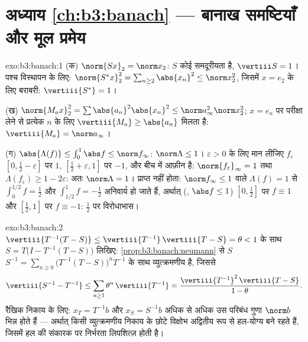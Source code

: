 \section*{अध्याय \ref{ch:b3:banach} --- बानाख समष्टियाँ और
मूल प्रमेय}

\begin{solution}{exo:b3:banach:1}
(क) $\norm{Sx}_2 = \norm x_2$: $S$ कोई समदूरीयता है, $\vertiii S =
1$। पश्च विस्थापन के लिए: $\norm{S^*x}_2^2 = \sum_{n \geq
2}\abs{x_n}^2 \leq \norm x_2^2$,
जिसमें $x = e_2$ के लिए बराबरी: $\vertiii{S^*} = 1$।

(ख) $\norm{M_ax}_2^2 = \sum\abs{a_n}^2\abs{x_n}^2 \leq \norm
a_\infty^2\norm x_2^2$; $x = e_n$ पर परीक्षा लेने से प्रत्येक $n$ के लिए $\vertiii{M_a}
\geq \abs{a_n}$ मिलता
है: $\vertiii{M_a} = \norm a_\infty$।

(ग) $\abs{\Lambda(f)} \leq \int_0^1\abs f \leq \norm f_\infty$: $\norm\Lambda \leq 1$। $\varepsilon > 0$ के लिए मान लीजिए $f_\varepsilon$ $[0, \frac12 - \varepsilon]$ पर $1$, $[\frac12 +
\varepsilon, 1]$ पर
$-1$, और बीच में आफ़ीन है: $\norm{f_\varepsilon}_\infty =
1$ तथा $\Lambda(f_\varepsilon) \geq 1 - 2\varepsilon$: अतः $\norm\Lambda = 1$। प्राप्त नहीं
होता: $\norm
f_\infty \leq 1$ वाले $\Lambda(f) = 1$ से $\int_0^{1/2}f = \frac12$ और $\int_{1/2}^1 f = -\frac12$ अनिवार्य हो जाते हैं, अर्थात्
(, $\abs f \leq 1$) $[0, \frac12]$ पर $f \equiv 1$ और $[\frac12,
1]$ पर $f \equiv -1$: $\frac12$ पर विरोधाभास।
\end{solution}

\begin{solution}{exo:b3:banach:2}
$\vertiii{T^{-1}(T-S)} \leq \vertiii{T^{-1}}\,\vertiii{T - S} =
\theta < 1$ के साथ $S = T\bigl(I - T^{-1}(T - S)\bigr)$ लिखिए: \cref{prop:b3:banach:neumann} से $S$ $S^{-1} = \sum_{n\geq0}\bigl(T^{-1}(T -
S)\bigr)^nT^{-1}$ के साथ व्युत्क्रमणीय है,
जिससे
\[
\vertiii{S^{-1} - T^{-1}} \leq
\sum_{n\geq1}\theta^n\,\vertiii{T^{-1}}
= \frac{\vertiii{T^{-1}}^2\,\vertiii{T - S}}{1 - \theta}.
\]
रैखिक निकाय के लिए: $x_T = T^{-1}b$ और $x_S = S^{-1}b$ अधिक से अधिक उस परिबंध गुणा $\norm b$
भिन्न होते हैं --- अर्थात् किसी व्युत्क्रमणीय निकाय के छोटे विक्षोभ
अद्वितीय रूप से हल-योग्य बने रहते हैं, जिसमें हल की संकारक पर निर्भरता
लिपशित्ज़ होती है।
\end{solution}

